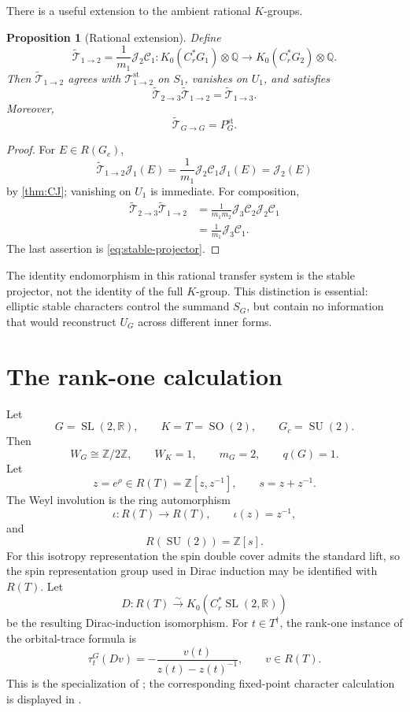 \documentclass[11pt]{amsart}
\newtheorem{proposition}[theorem]{Proposition}
\theoremstyle{definition}
\theoremstyle{remark}
\newcommand{\R}{\mathbb R}
\newcommand{\Z}{\mathbb Z}
\newcommand{\Q}{\mathbb Q}
\newcommand{\Cr}{C_r^*}
\newcommand{\st}{\mathrm{st}}
\newcommand{\SL}{\operatorname{SL}}
\newcommand{\SO}{\operatorname{SO}}
\newcommand{\SU}{\operatorname{SU}}
\begin{document}
There is a useful extension to the ambient rational $K$-groups.

\begin{proposition}[Rational extension]\label{prop:rational-transfer}
Define
\begin{equation}\label{eq:rational-transfer}
  \widetilde{\mathcal T}_{1\to2}
  =\frac1{m_1}\mathcal J_2\mathcal C_1:
  K_0(\Cr G_1)\otimes\Q
  \longrightarrow
  K_0(\Cr G_2)\otimes\Q.
\end{equation}
Then $\widetilde{\mathcal T}_{1\to2}$ agrees with $\mathcal T^{\st}_{1\to2}$ on $S_1$, vanishes on $U_1$, and satisfies
\[
  \widetilde{\mathcal T}_{2\to3}
  \widetilde{\mathcal T}_{1\to2}
  =\widetilde{\mathcal T}_{1\to3}.
\]
Moreover,
\[
  \widetilde{\mathcal T}_{G\to G}=P_G^{\st}.
\]
\end{proposition}

\begin{proof}
For $E\in R(G_c)$,
\[
  \widetilde{\mathcal T}_{1\to2}\mathcal J_1(E)
  =\frac1{m_1}\mathcal J_2\mathcal C_1\mathcal J_1(E)
  =\mathcal J_2(E)
\]
by \cref{thm:CJ}; vanishing on $U_1$ is immediate.  For composition,
\begin{align*}
  \widetilde{\mathcal T}_{2\to3}
  \widetilde{\mathcal T}_{1\to2}
  &=\frac1{m_1m_2}
    \mathcal J_3\mathcal C_2\mathcal J_2\mathcal C_1\\
  &=\frac1{m_1}\mathcal J_3\mathcal C_1.
\end{align*}
The last assertion is \eqref{eq:stable-projector}.
\end{proof}

The identity endomorphism in this rational transfer system is the stable projector, not the identity of the full $K$-group.  This distinction is essential: elliptic stable characters control the summand $S_G$, but contain no information that would reconstruct $U_G$ across different inner forms.

\section{The rank-one calculation}\label{sec:sl2}

Let
\[
  G=\SL(2,\R),
  \qquad K=T=\SO(2),
  \qquad G_c=\SU(2).
\]
Then
\[
  W_G\cong\Z/2\Z,
  \qquad W_K=1,
  \qquad m_G=2,
  \qquad q(G)=1.
\]
Let
\[
  z=e^\rho\in R(T)=\Z[z,z^{-1}],
  \qquad
  s=z+z^{-1}.
\]
The Weyl involution is the ring automorphism
\[
  \iota:R(T)\longrightarrow R(T),
  \qquad \iota(z)=z^{-1},
\]
and
\[
  R(\SU(2))=\Z[s].
\]
For this isotropy representation the spin double cover admits the standard lift, so the spin representation group used in Dirac induction may be identified with $R(T)$.  Let
\[
  D:R(T)\overset{\sim}{\longrightarrow}K_0(\Cr\SL(2,\R))
\]
be the resulting Dirac-induction isomorphism.  For $t\in T^\dagger$, the rank-one instance of the orbital-trace formula is
\begin{equation}\label{eq:sl2-orbital}
  \tau_t^G(Dv)
  =-\frac{v(t)}{z(t)-z(t)^{-1}},
  \qquad v\in R(T).
\end{equation}
This is the specialization of \cite[Theorem~3.2]{HochsWang2019Orbital}; the corresponding fixed-point character calculation is displayed in \cite[Section~3.5]{HochsWang2018Shelstad}.
\end{document}
